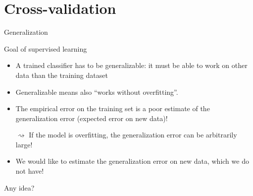 \documentclass[xcolor={usenames,dvipsnames},handout]{beamer}
\begin{document}
 \section{Cross-validation}
 
 \begin{frame}{Generalization}
 
\begin{block}{Goal of supervised learning}
\begin{itemize}
\item A trained classifier has to be generalizable: it must be able to work on other data than the training dataset
\item Generalizable means also “works without overfitting”. 
\end{itemize}
\end{block}
\begin{itemize}
\item The empirical error on the training set is a poor estimate of the generalization error (expected error on new data)!

$\rightsquigarrow$ If the model is overfitting, the generalization error can be arbitrarily large!
\item  We would like to estimate the generalization error on new data, which we do not have!
\end{itemize}

\begin{alertblock}{}
Any idea?
\end{alertblock}
\end{frame}
 
\end{document}
